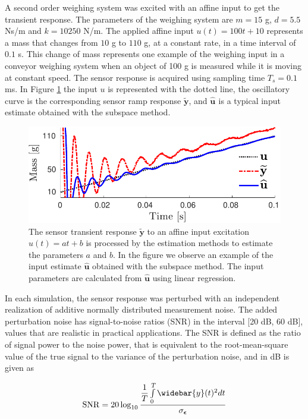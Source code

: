 A second order weighing system was excited with an affine input to get the transient response.
The parameters of the weighing system are $m = 15$ g, $d = 5.5$ Ns/m and $k = 10250$ N/m.
The applied affine input $u(t) = 100 t + 10$ represents a mass that changes from $10$ g to $110$ g, at a constant rate, in a time interval of $0.1$ s.
This change of mass represents one example of the weighing input in a conveyor weighing system when an object of 100 g is measured while it is moving at constant speed.
The sensor response is acquired using sampling time $T_s = 0.1$ ms.
In Figure \ref{fig:sensor_weight} the input $u$ is represented with the dotted line, the oscillatory curve is the corresponding sensor ramp response $\widetilde{\mathbf{y}}$, and $\widehat{\mathbf{u}}_{\mathrm{}}$ is a typical input estimate obtained with the subspace method.


\begin{figure}[!htbp]
\centering
\includegraphics[width=1\columnwidth]{./ChapterRampInput/fig/Fig_2.pdf} 
\caption{ \label{fig:sensor_weight} The sensor transient response $\widetilde{\mathbf{y}}$ to an affine input excitation $u(t) = at+b$ is processed by the estimation methods to estimate the parameters $a$ and $b$. In the figure we observe an example of the input estimate $\widehat{\mathbf{u}}$ obtained with the subspace method. The input parameters are calculated from $\widehat{\mathbf{u}}$ using linear regression.}
\end{figure}

In each simulation, the sensor response was perturbed with an independent realization of additive normally distributed measurement noise.
The added perturbation noise has signal-to-noise ratios (SNR) in the interval [20 dB, 60 dB], values that are realistic in practical applications.
The SNR is defined as the ratio of signal power to the noise power, that is equivalent to the root-mean-square value of the true signal to the variance of the perturbation noise, and in dB is given as

\begin{equation} \mathrm{SNR} = 20 \log_{10}{\dfrac{\dfrac{1}{T}\int\limits_0^T{\widebar{y}(t)^2 d t}}{\sigma_{\bm{\epsilon}}}} \end{equation}  


